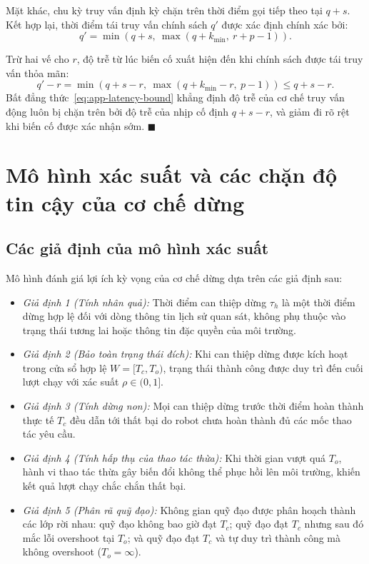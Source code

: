 Mặt khác, chu kỳ truy vấn định kỳ chặn trên thời điểm gọi tiếp theo tại $q + s$. Kết hợp lại, thời điểm tái truy vấn chính sách $q'$ được xác định chính xác bởi:
\begin{equation}
q' = \min(q + s,\ \max(q + k_{\min},\ r + p - 1)).
\label{eq:app-latency-formula}
\end{equation}

Trừ hai vế cho $r$, độ trễ từ lúc biến cố xuất hiện đến khi chính sách được tái truy vấn thỏa mãn:
\begin{equation}
q' - r = \min(q + s - r,\ \max(q + k_{\min} - r,\ p - 1)) \le q + s - r.
\label{eq:app-latency-bound}
\end{equation}
Bất đẳng thức~\eqref{eq:app-latency-bound} khẳng định độ trễ của cơ chế truy vấn động luôn bị chặn trên bởi độ trễ của nhịp cố định $q + s - r$, và giảm đi rõ rệt khi biến cố được xác nhận sớm. $\blacksquare$

\section{Mô hình xác suất và các chặn độ tin cậy của cơ chế dừng}
\label{sec:app-halt-bounds}

\subsection{Các giả định của mô hình xác suất}
Mô hình đánh giá lợi ích kỳ vọng của cơ chế dừng dựa trên các giả định sau:
\begin{itemize}
\item \textit{Giả định 1 (Tính nhân quả):} Thời điểm can thiệp dừng $\tau_h$ là một thời điểm dừng hợp lệ đối với dòng thông tin lịch sử quan sát, không phụ thuộc vào trạng thái tương lai hoặc thông tin đặc quyền của môi trường.
\item \textit{Giả định 2 (Bảo toàn trạng thái đích):} Khi can thiệp dừng được kích hoạt trong cửa sổ hợp lệ $W = [T_c, T_o)$, trạng thái thành công được duy trì đến cuối lượt chạy với xác suất $\rho \in (0, 1]$.
\item \textit{Giả định 3 (Tính dừng non):} Mọi can thiệp dừng trước thời điểm hoàn thành thực tế $T_c$ đều dẫn tới thất bại do robot chưa hoàn thành đủ các mốc thao tác yêu cầu.
\item \textit{Giả định 4 (Tính hấp thụ của thao tác thừa):} Khi thời gian vượt quá $T_o$, hành vi thao tác thừa gây biến đổi không thể phục hồi lên môi trường, khiến kết quả lượt chạy chắc chắn thất bại.
\item \textit{Giả định 5 (Phân rã quỹ đạo):} Không gian quỹ đạo được phân hoạch thành các lớp rời nhau: quỹ đạo không bao giờ đạt $T_c$; quỹ đạo đạt $T_c$ nhưng sau đó mắc lỗi overshoot tại $T_o$; và quỹ đạo đạt $T_c$ và tự duy trì thành công mà không overshoot ($T_o = \infty$).
\end{itemize}

